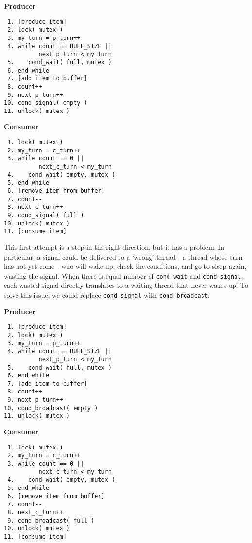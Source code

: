 \begin{multicols}{2}
    \small
    \textbf{Producer}
    \begin{verbatim}
 1. [produce item]
 2. lock( mutex )
 3. my_turn = p_turn++
 4. while count == BUFF_SIZE ||
          next_p_turn < my_turn
 5.    cond_wait( full, mutex )
 6. end while
 7. [add item to buffer]
 8. count++
 9. next_p_turn++
10. cond_signal( empty )
11. unlock( mutex )
    \end{verbatim}
    \columnbreak
    \textbf{Consumer}\vspace{-2em}
    \begin{verbatim}
 1. lock( mutex )
 2. my_turn = c_turn++
 3. while count == 0 ||
          next_c_turn < my_turn
 4.    cond_wait( empty, mutex )
 5. end while
 6. [remove item from buffer]
 7. count--
 8. next_c_turn++
 9. cond_signal( full )
10. unlock( mutex )
11. [consume item]
    \end{verbatim}
\end{multicols}
\vspace{-2em}

This first attempt is a step in the right direction, but it has a problem.
In particular, a signal could be delivered to a `wrong' thread—a thread whose turn has not yet come—who will wake up, check the conditions, and go to sleep again, wasting the signal.
When there is equal number of \texttt{cond\_wait} and \texttt{cond\_signal}, each wasted signal directly translates to a waiting thread that never wakes up!
To solve this issue, we could replace \texttt{cond\_signal} with \texttt{cond\_broadcast}:

\begin{multicols}{2}
    \small
    \textbf{Producer}
    \begin{verbatim}
 1. [produce item]
 2. lock( mutex )
 3. my_turn = p_turn++
 4. while count == BUFF_SIZE ||
          next_p_turn < my_turn
 5.    cond_wait( full, mutex )
 6. end while
 7. [add item to buffer]
 8. count++
 9. next_p_turn++
10. cond_broadcast( empty )
11. unlock( mutex )
    \end{verbatim}
    \columnbreak
    \textbf{Consumer}\vspace{-2em}
    \begin{verbatim}
 1. lock( mutex )
 2. my_turn = c_turn++
 3. while count == 0 ||
          next_c_turn < my_turn
 4.    cond_wait( empty, mutex )
 5. end while
 6. [remove item from buffer]
 7. count--
 8. next_c_turn++
 9. cond_broadcast( full )
10. unlock( mutex )
11. [consume item]
    \end{verbatim}
\end{multicols}
\vspace{-2em}

